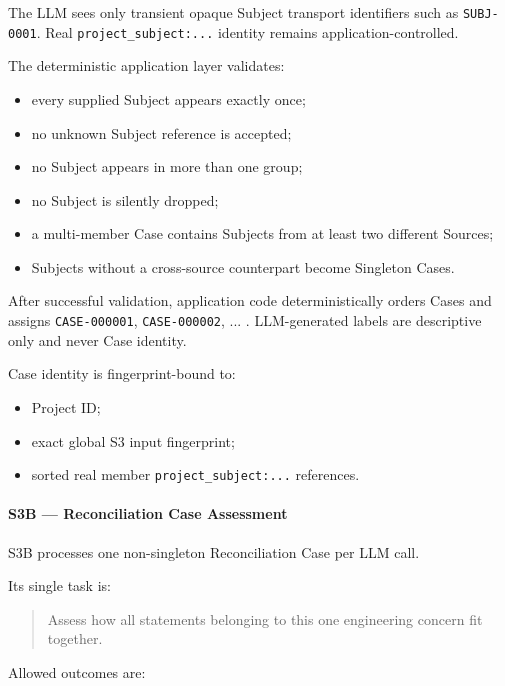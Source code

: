 The LLM sees only transient opaque Subject transport identifiers such as \texttt{SUBJ-0001}. Real \texttt{project\_subject:...} identity remains application-controlled.

The deterministic application layer validates:

\begin{itemize}
\tightlist
\item
  every supplied Subject appears exactly once;
\item
  no unknown Subject reference is accepted;
\item
  no Subject appears in more than one group;
\item
  no Subject is silently dropped;
\item
  a multi-member Case contains Subjects from at least two different Sources;
\item
  Subjects without a cross-source counterpart become Singleton Cases.
\end{itemize}

After successful validation, application code deterministically orders Cases and assigns \texttt{CASE-000001}, \texttt{CASE-000002}, ... . LLM-generated labels are descriptive only and never Case identity.

Case identity is fingerprint-bound to:

\begin{itemize}
\tightlist
\item
  Project ID;
\item
  exact global S3 input fingerprint;
\item
  sorted real member \texttt{project\_subject:...} references.
\end{itemize}

\hypertarget{s3b--reconciliation-case-assessment}{%
\paragraph{S3B --- Reconciliation Case Assessment}\label{s3b--reconciliation-case-assessment}}

S3B processes one non-singleton Reconciliation Case per LLM call.

Its single task is:

\begin{quote}
Assess how all statements belonging to this one engineering concern fit together.
\end{quote}

Allowed outcomes are:

